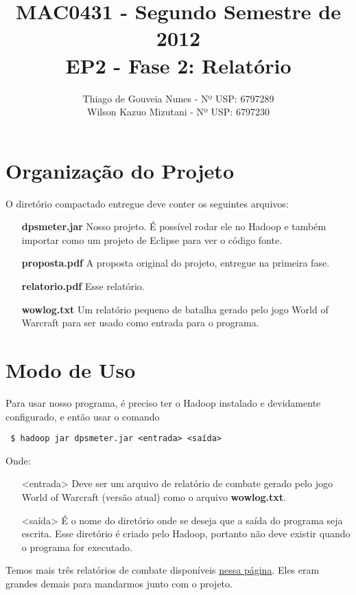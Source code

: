 \documentclass[a4paper,11pt]{article}
\title{MAC0431 - Segundo Semestre de 2012 \\
       EP2 - Fase 2: Relatório}
\author{Thiago de Gouveia Nunes - Nº USP: 6797289 \\
        Wilson Kazuo Mizutani - Nº USP: 6797230}
\begin{document}
\maketitle

\section{Organização do Projeto}

  O diretório compactado entregue deve conter os seguintes arquivos:
  
  \begin{itemize}
    \item[\textbf{dpsmeter.jar}]
      Nosso projeto. É possível rodar ele no Hadoop e também importar como um
      projeto de Eclipse para ver o código fonte.
    \item[\textbf{proposta.pdf}]
      A proposta original do projeto, entregue na primeira fase.
    \item[\textbf{relatorio.pdf}]
      Esse relatório.
    \item[\textbf{wowlog.txt}]
      Um relatório pequeno de batalha gerado pelo jogo World of Warcraft para
      ser usado como entrada para o programa.
  \end{itemize}
  
\section{Modo de Uso}

  Para usar nosso programa, é preciso ter o Hadoop instalado e devidamente
  configurado, e então usar o comando
  
  \begin{verbatim} $ hadoop jar dpsmeter.jar <entrada> <saída> \end{verbatim}
  
  Onde:
  
  \begin{itemize}
    \item[<entrada>]
      Deve ser um arquivo de relatório de combate gerado pelo jogo World of
      Warcraft (versão atual) como o arquivo \textbf{wowlog.txt}.
    \item[<saída>]
      É o nome do diretório onde se deseja que a saída do programa seja escrita.
      Esse diretório é criado pelo Hadoop, portanto não deve existir quando o
      programa for executado.
  \end{itemize}
  
  Temos mais três relatórios de combate disponíveis
  \href{http://www.linux.ime.usp.br/~gorobaum/logs/}{nessa página}. Eles eram
  grandes demais para mandarmos junto com o projeto.
  
\end{document}
